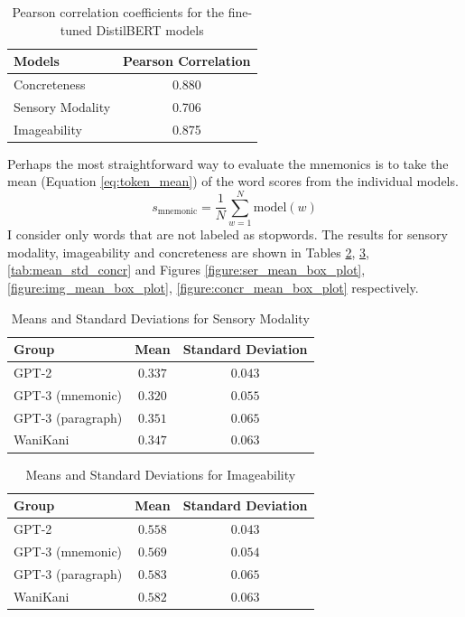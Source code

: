 \begin{table}[ht]
\centering
\begin{tabular}{@{}lc@{}}
\toprule
Models          & Pearson Correlation \\ \midrule
Concreteness             & 0.880                        \\
Sensory Modality         & 0.706                        \\
Imageability             & 0.875                        \\ \bottomrule
\end{tabular}
\caption{Pearson correlation coefficients for the fine-tuned DistilBERT models}
\label{tab:linguistic_features_pearsonr}
\end{table}
Perhaps the most straightforward way to evaluate the mnemonics is to take the mean (Equation \ref{eq:token_mean}) of the word scores from the individual models.
\begin{equation} \label{eq:token_mean}
    s_{\text{mnemonic}} = \frac{1}{N}\sum_{w=1}^{N}\text{model}(w)
\end{equation}
I consider only words that are not labeled as stopwords. The results for sensory modality, imageability and concreteness are shown in Tables \ref{tab:mean_std_ser}, \ref{tab:mean_std_img}, \ref{tab:mean_std_concr} and Figures \ref{figure:ser_mean_box_plot}, \ref{figure:img_mean_box_plot}, \ref{figure:concr_mean_box_plot} respectively.
\begin{table}[ht] 
\centering
\caption{Means and Standard Deviations for Sensory Modality}
\label{table:group_stats}
\begin{tabular}{lcc}
\toprule
Group & Mean & Standard Deviation \\
\midrule
GPT-2& $0.337$ & $0.043$ \\
GPT-3 (mnemonic) & $0.320$ & $0.055$ \\
GPT-3 (paragraph)& $0.351$ & $0.065$ \\
WaniKani & $0.347$ & $0.063$ \\
\bottomrule
\end{tabular}
\label{tab:mean_std_ser}
\end{table}

\begin{table}[ht] 
\centering
\caption{Means and Standard Deviations for Imageability}
\label{table:group_stats}
\begin{tabular}{lcc}
\toprule
Group & Mean & Standard Deviation \\
\midrule
GPT-2& $0.558$ & $0.043$ \\
GPT-3 (mnemonic) & $0.569$ & $0.054$ \\
GPT-3 (paragraph)& $0.583$ & $0.065$ \\
WaniKani & $0.582$ & $0.063$ \\
\bottomrule
\end{tabular}
\label{tab:mean_std_img}
\end{table}

